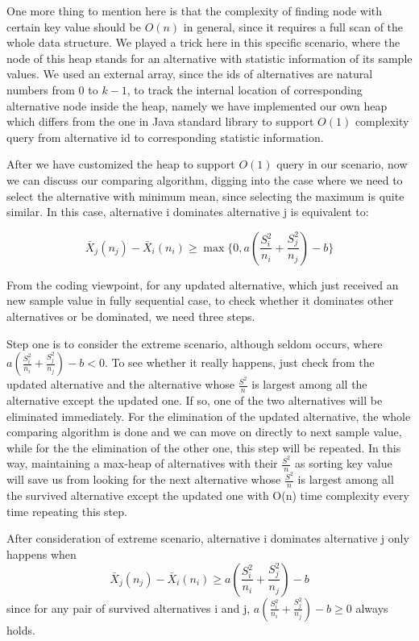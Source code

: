 \documentclass[12pt,a4]{report}
\begin{document}
One more thing to mention here is that the complexity of finding node with certain key value should be $O(n)$ in general, since it requires a full scan of the whole data structure. We played a trick here in this specific scenario, where the node of this heap stands for an alternative with statistic information of its sample values. We used an external array, since the ids of alternatives are natural numbers from $0$ to $k - 1$, to track the internal location of corresponding alternative node inside the heap, namely we have implemented our own heap which differs from the one in Java standard library to support $O(1)$ complexity query from alternative id to corresponding statistic information.

After we have customized the heap to support $O(1)$ query in our scenario, now we can discuss our comparing algorithm, digging into the case where we need to select the alternative with minimum mean, since selecting the maximum is quite similar. In this case, alternative i dominates alternative j is equivalent to:

$$ \bar{X}_j(n_j)-\bar{X}_i(n_i) \ge \max\{0,a(\frac{S_i^2}{n_i}+\frac{S_j^2}{n_j}) - b\} $$

From the coding viewpoint, for any updated alternative, which just received an new sample value in fully sequential case, to check whether it dominates other alternatives or be dominated, we need three steps.

Step one is to consider the extreme scenario, although seldom occurs, where $a(\frac{S_i^2}{n_i}+\frac{S_j^2}{n_j}) - b < 0$. To see whether it really happens, just check from the updated alternative and the alternative whose $\frac{S^2}{n}$ is largest among all the alternative except the updated one. If so, one of the two alternatives will be eliminated immediately. For the elimination of the updated alternative, the whole comparing algorithm is done and we can move on directly to next sample value, while for the the elimination of the other one, this step will be repeated. In this way, maintaining a max-heap of alternatives with their $\frac{S^2}{n}$ as sorting key value will save us from looking for the next alternative whose $\frac{S^2}{n}$ is largest among all the survived alternative except the updated one with O(n) time complexity every time repeating this step.

After consideration of extreme scenario, alternative i dominates alternative j only happens when
$$ \bar{X}_j(n_j)-\bar{X}_i(n_i) \ge a(\frac{S_i^2}{n_i}+\frac{S_j^2}{n_j}) - b $$
since for any pair of survived alternatives i and j, $a(\frac{S_i^2}{n_i}+\frac{S_j^2}{n_j}) - b \ge 0$ always holds.
\end{document}
